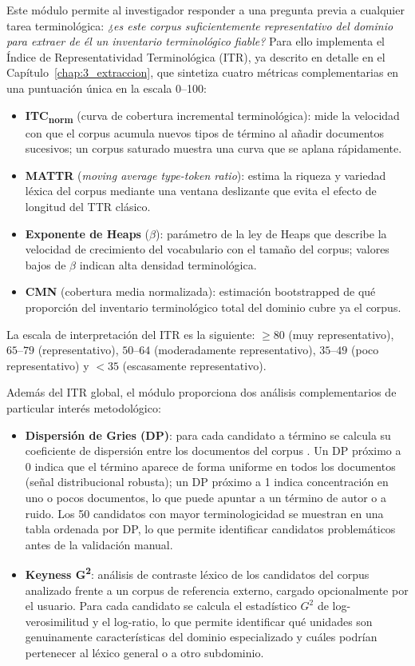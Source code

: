 Este módulo permite al investigador responder a una pregunta previa a cualquier tarea terminológica: \emph{¿es este corpus suficientemente representativo del dominio para extraer de él un inventario terminológico fiable?} Para ello implementa el Índice de Representatividad Terminológica (ITR), ya descrito en detalle en el Capítulo~\ref{chap:3_extraccion}, que sintetiza cuatro métricas complementarias en una puntuación única en la escala 0--100:

\begin{itemize}
    \item \textbf{ITC\textsubscript{norm}} (curva de cobertura incremental terminológica): mide la velocidad con que el corpus acumula nuevos tipos de término al añadir documentos sucesivos; un corpus saturado muestra una curva que se aplana rápidamente.
    \item \textbf{MATTR} (\textit{moving average type-token ratio}): estima la riqueza y variedad léxica del corpus mediante una ventana deslizante que evita el efecto de longitud del TTR clásico.
    \item \textbf{Exponente de Heaps} ($\beta$): parámetro de la ley de Heaps que describe la velocidad de crecimiento del vocabulario con el tamaño del corpus; valores bajos de $\beta$ indican alta densidad terminológica.
    \item \textbf{CMN} (cobertura media normalizada): estimación bootstrapped de qué proporción del inventario terminológico total del dominio cubre ya el corpus.
\end{itemize}

La escala de interpretación del ITR es la siguiente: $\geq80$ (muy representativo), $65$--$79$ (representativo), $50$--$64$ (moderadamente representativo), $35$--$49$ (poco representativo) y $<35$ (escasamente representativo).

Además del ITR global, el módulo proporciona dos análisis complementarios de particular interés metodológico:

\begin{itemize}
    \item \textbf{Dispersión de Gries (DP)}: para cada candidato a término se calcula su coeficiente de dispersión entre los documentos del corpus \autocite{gries2021dispersion}. Un DP próximo a 0 indica que el término aparece de forma uniforme en todos los documentos (señal distribucional robusta); un DP próximo a 1 indica concentración en uno o pocos documentos, lo que puede apuntar a un término de autor o a ruido. Los 50 candidatos con mayor terminologicidad se muestran en una tabla ordenada por DP, lo que permite identificar candidatos problemáticos antes de la validación manual.
    \item \textbf{Keyness G\textsuperscript{2}}: análisis de contraste léxico de los candidatos del corpus analizado frente a un corpus de referencia externo, cargado opcionalmente por el usuario. Para cada candidato se calcula el estadístico $G^2$ de log-verosimilitud \autocite{dunning1993accurate} y el log-ratio, lo que permite identificar qué unidades son genuinamente características del dominio especializado y cuáles podrían pertenecer al léxico general o a otro subdominio.
\end{itemize}

